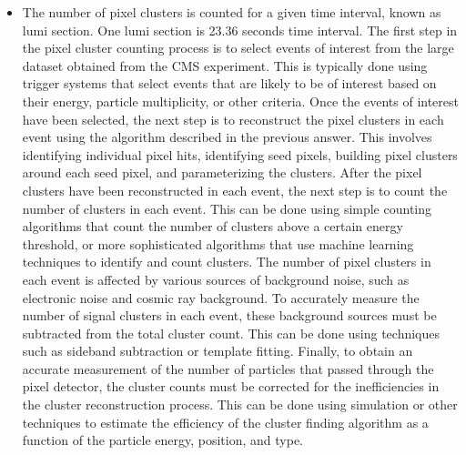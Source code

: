 \begin{itemize}
\item The number of pixel clusters is counted for a given time interval, known as lumi section. One lumi section is 23.36 seconds time interval. The first step in the pixel cluster counting process is to select events of interest from the large dataset obtained from the CMS experiment. This is typically done using trigger systems that select events that are likely to be of interest based on their energy, particle multiplicity, or other criteria. Once the events of interest have been selected, the next step is to reconstruct the pixel clusters in each event using the algorithm described in the previous answer. This involves identifying individual pixel hits, identifying seed pixels, building pixel clusters around each seed pixel, and parameterizing the clusters. After the pixel clusters have been reconstructed in each event, the next step is to count the number of clusters in each event. This can be done using simple counting algorithms that count the number of clusters above a certain energy threshold, or more sophisticated algorithms that use machine learning techniques to identify and count clusters. The number of pixel clusters in each event is affected by various sources of background noise, such as electronic noise and cosmic ray background. To accurately measure the number of signal clusters in each event, these background sources must be subtracted from the total cluster count. This can be done using techniques such as sideband subtraction or template fitting. Finally, to obtain an accurate measurement of the number of particles that passed through the pixel detector, the cluster counts must be corrected for the inefficiencies in the cluster reconstruction process. This can be done using simulation or other techniques to estimate the efficiency of the cluster finding algorithm as a function of the particle energy, position, and type.


\end{itemize}
